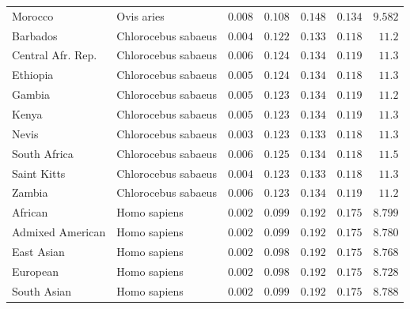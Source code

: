 \documentclass[12pt]{article}
\begin{document}
\begin{center}
\begin{longtable*}{|l|l|r|r|r|r|r|}
            Morocco &          Ovis aries &               $ 0.008$ &                    $ 0.108$ &  $ 0.148$ &           $ 0.134$ &     $ 9.582$ \\
             Barbados & Chlorocebus sabaeus &               $ 0.004$ &                    $ 0.122$ &  $ 0.133$ &           $ 0.118$ &     $  11.2$ \\
             Central Afr. Rep. & Chlorocebus sabaeus &               $ 0.006$ &                    $ 0.124$ &  $ 0.134$ &           $ 0.119$ &     $  11.3$ \\
             Ethiopia & Chlorocebus sabaeus &               $ 0.005$ &                    $ 0.124$ &  $ 0.134$ &           $ 0.118$ &     $  11.3$ \\
             Gambia & Chlorocebus sabaeus &               $ 0.005$ &                    $ 0.123$ &  $ 0.134$ &           $ 0.119$ &     $  11.2$ \\
             Kenya & Chlorocebus sabaeus &               $ 0.005$ &                    $ 0.123$ &  $ 0.134$ &           $ 0.119$ &     $  11.3$ \\
             Nevis & Chlorocebus sabaeus &               $ 0.003$ &                    $ 0.123$ &  $ 0.133$ &           $ 0.118$ &     $  11.3$ \\
             South Africa  & Chlorocebus sabaeus &               $ 0.006$ &                    $ 0.125$ &  $ 0.134$ &           $ 0.118$ &     $  11.5$ \\
             Saint Kitts & Chlorocebus sabaeus &               $ 0.004$ &                    $ 0.123$ &  $ 0.133$ &           $ 0.118$ &     $  11.3$ \\
             Zambia & Chlorocebus sabaeus &               $ 0.006$ &                    $ 0.123$ &  $ 0.134$ &           $ 0.119$ &     $  11.2$ \\
            African &        Homo sapiens &               $ 0.002$ &                    $ 0.099$ &  $ 0.192$ &           $ 0.175$ &     $ 8.799$ \\
            Admixed American &        Homo sapiens &               $ 0.002$ &                    $ 0.099$ &  $ 0.192$ &           $ 0.175$ &     $ 8.780$ \\
            East Asian &        Homo sapiens &               $ 0.002$ &                    $ 0.098$ &  $ 0.192$ &           $ 0.175$ &     $ 8.768$ \\
            European &        Homo sapiens &               $ 0.002$ &                    $ 0.098$ &  $ 0.192$ &           $ 0.175$ &     $ 8.728$ \\
            South Asian &        Homo sapiens &               $ 0.002$ &                    $ 0.099$ &  $ 0.192$ &           $ 0.175$ &     $ 8.788$ \\
        \end{longtable*}
    \end{center}
\end{document}
